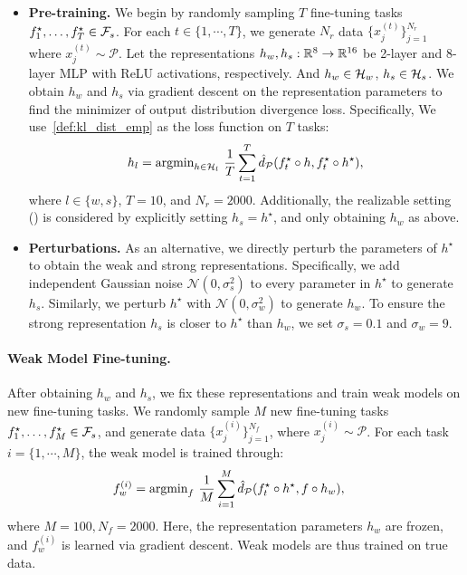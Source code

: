 \begin{itemize}
    \item \textbf{Pre-training.} We begin by randomly sampling $T$ fine-tuning tasks $f_1^\star,\dots,f_T^\star \in \mathcal{F}_s$. 
    For each $t \in \{ 1, \cdots, T \}$, we generate $N_r$ data $\{x^{(t)}_j\}_{j=1}^{N_r}$ where $x^{(t)}_j \sim \mathcal{P}$.
    Let the representations $h_w, h_s: \mathbb{R}^8 \to \mathbb{R}^{16}$ be 2-layer and 8-layer MLP with ReLU activations, respectively. And $h_w \in \mathcal{H}_w$, $h_s \in \mathcal{H}_s$.
    We obtain $h_w$ and $h_s$ via gradient descent on the representation parameters to find the minimizer of output distribution divergence loss. 
    Specifically, We use~\cref{def:kl_dist_emp} as the loss function on $T$ tasks:
    \begin{align} \label{eqn:expts-obtain-representations}
    h_l = \text{argmin}_{h \in \mathcal{H}_l} \ \frac{1}{T} \sum_{t=1}^T \hat{d}_\mathcal{P}(f_t^\star \circ h, f_t^\star \circ h^\star),
    \end{align}
    where $l \in \{w, s\}$,  $T=10$, and $N_r=2000$.
    Additionally, the realizable setting () is considered by explicitly setting $h_s = h^\star$, and only obtaining $h_w$ as above.
    \item \textbf{Perturbations.} As an alternative, we directly perturb the parameters of $h^\star$ to obtain the weak and strong representations. 
    Specifically, we add independent Gaussian noise $\mathcal{N}(0, \sigma_s^2)$ to every parameter in $h^\star$ to generate $h_s$. 
    Similarly, we perturb $h^\star$ with $\mathcal{N}(0, \sigma_w^2)$ to generate $h_w$. 
    To ensure the strong representation $h_s$ is closer to $h^\star$ than $h_w$, we set $\sigma_s=0.1$ and $\sigma_w=9$.
\end{itemize}

\paragraph{Weak Model Fine-tuning.} 
After obtaining $h_w$ and $h_s$, we fix these representations and train weak models on new fine-tuning tasks.
We randomly sample $M$ new fine-tuning tasks $f_1^\star,\dots,f_M^\star \in \mathcal{F}_s$, and generate data $\{x^{(i)}_j\}_{j=1}^{N_f}$, where $x^{(i)}_j \sim \mathcal{P}$. 
For each task $i=\{1, \cdots, M \}$, the weak model is trained through:
\begin{align}
    \label{eqn:weak-model-finetuning}
    f^{(i)}_{w} &= \text{argmin}_{f} \ \frac{1}{M} \sum_{i=1}^M \hat{d}_\mathcal{P}(f_t^\star \circ h^\star, f \circ h_w),
\end{align}
where $M=100, N_f=2000$.
Here, the representation parameters $h_w$ are frozen, and $f^{(i)}_{w}$ is learned via gradient descent. 
Weak models are thus trained on true data.


